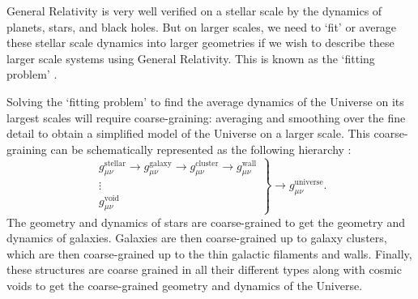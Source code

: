 \documentclass[a4paper,12pt]{report}
\begin{document}
General Relativity is very well verified on a stellar scale by the dynamics of planets, stars, and black holes. But on larger scales, we need to `fit' or average these stellar scale dynamics into larger geometries if we wish to describe these larger scale systems using General Relativity. This is known as the `fitting problem' \cite{RN203,RN204,RN179}.

Solving the `fitting problem' to find the average dynamics of the Universe on its largest scales will require coarse-graining: averaging and smoothing over the fine detail to obtain a simplified model of the Universe on a larger scale. This coarse-graining can be schematically represented as the following hierarchy \cite{RN179}:
\begin{equation}\label{eqn: averaging schematic}
\left.
\begin{array}{r}
    g^\text{stellar}_{\mu\nu} \to g^\text{galaxy}_{\mu\nu} \to g^\text{cluster}_{\mu\nu} \to g^\text{wall}_{\mu\nu} \\
    \vdots \\
    g^\text{void}_{\mu\nu}
\end{array}
\right\}
\to g^\text{universe}_{\mu\nu}.
\end{equation}
The geometry and dynamics of stars are coarse-grained to get the geometry and dynamics of galaxies. Galaxies are then coarse-grained up to galaxy clusters, which are then coarse-grained up to the thin galactic filaments and walls. Finally, these structures are coarse grained in all their different types along with cosmic voids to get the coarse-grained geometry and dynamics of the Universe.
\end{document}
